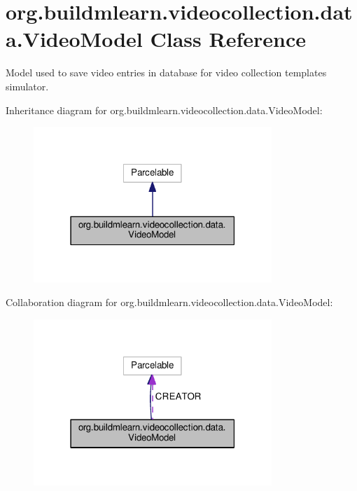 \hypertarget{classorg_1_1buildmlearn_1_1videocollection_1_1data_1_1VideoModel}{}\section{org.\+buildmlearn.\+videocollection.\+data.\+Video\+Model Class Reference}
\label{classorg_1_1buildmlearn_1_1videocollection_1_1data_1_1VideoModel}


Model used to save video entries in database for video collection template\textquotesingle{}s simulator.  




Inheritance diagram for org.\+buildmlearn.\+videocollection.\+data.\+Video\+Model\+:
\nopagebreak
\begin{figure}[H]
\begin{center}
\leavevmode
\includegraphics[width=255pt]{classorg_1_1buildmlearn_1_1videocollection_1_1data_1_1VideoModel__inherit__graph}
\end{center}
\end{figure}


Collaboration diagram for org.\+buildmlearn.\+videocollection.\+data.\+Video\+Model\+:
\nopagebreak
\begin{figure}[H]
\begin{center}
\leavevmode
\includegraphics[width=255pt]{classorg_1_1buildmlearn_1_1videocollection_1_1data_1_1VideoModel__coll__graph}
\end{center}
\end{figure}
